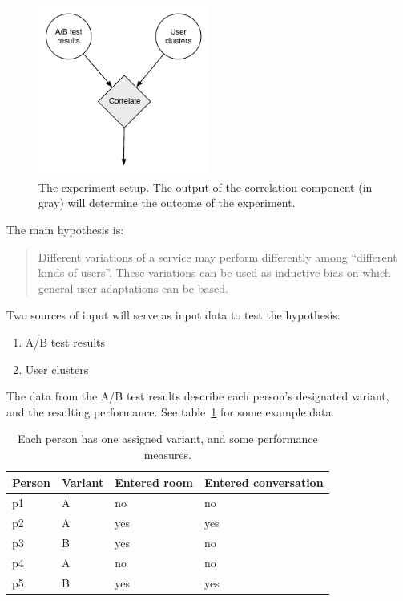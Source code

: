 \begin{figure}[h]
  \centering
    \includegraphics[width=0.5\textwidth]{Figures/experimental-setup}
    \caption{The experiment setup. The output of the correlation component (in gray) will determine the outcome of the experiment.}
    \label{fig:experimental-setup}
\end{figure}

The main hypothesis is:

\begin{quote}
  Different variations of a service may perform differently among ``different kinds of users''. These variations can be used as inductive bias on which general user adaptations can be based.
\end{quote}

Two sources of input will serve as input data to test the hypothesis:

\begin{enumerate}
  \item A/B test results
  \item User clusters
\end{enumerate}

The data from the A/B test results describe each person's designated variant, and the resulting performance. See table~\ref{tab:person_variants} for some example data.

\begin{table}[h]
  \centering
  \begin{tabular}{|l|l|ll|}
    \hline
    Person & Variant & Entered room & Entered conversation \\ \hline
    p1     & A       & no           & no  \\
    p2     & A       & yes          & yes \\
    p3     & B       & yes          & no  \\
    p4     & A       & no           & no  \\
    p5     & B       & yes          & yes \\ \hline
  \end{tabular}
  \caption{Each person has one assigned variant, and some performance measures.}
  \label{tab:person_variants}
\end{table}

